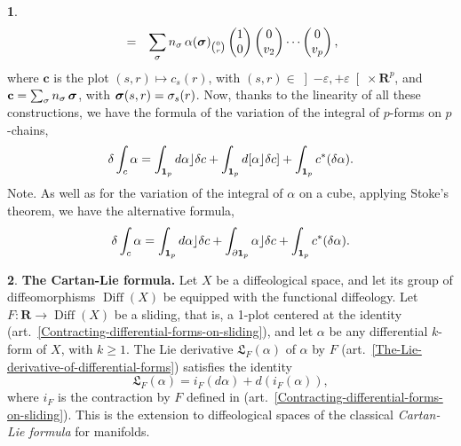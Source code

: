 \documentclass[11pt,reqno]{amsart}
\theoremstyle{definition}
\newtheorem{article}{}
\newcommand{\artlabel}[1]{{\bf #1.}}
\newcommand{\RR}{{\mathbf R}}
\newcommand{\cc}{{\mathbf c}}
\newcommand{\bsigma}{\mbox{\boldmath $\sigma$}}
\newcommand{\bmc}{\cc}
\def \F{{F}}
\def \X{{X}}
\newcommand{\fL}{{\mathfrak  L}}
\newcommand{\art}[1]{{(art.~\ref{#1})}}
\newcommand{\Diff}{\operatorname{Diff}}
\newcommand{\openinterval}[1]{\left] #1 \right[}
\newcommand{\DLie}{{\fL}}
\newcommand{\id}{{\bf 1}}
\begin{document}
\begin{article}
\begin{eqnarray*}
      & = & \sum_\sigma n_\sigma \, \alpha(\bsigma)_{0 \choose
      r}\begin{pmatrix}1 \\ 0\end{pmatrix} \begin{pmatrix}0 \\ v_2\end{pmatrix} \cdots 
      \begin{pmatrix}0 \\ v_{p}\end{pmatrix},
    \end{eqnarray*}
    where $\bmc$ is the plot $(s,r) \mapsto
      c_s(r)$, with $(s,r) \in \openinterval{-\varepsilon,
        +\varepsilon} \times \RR^p$, and $\bmc = \sum_\sigma
          n_\sigma \, \bsigma$, with $\bsigma(s,r) = \sigma_s(r)$.
    Now, thanks to the linearity of all these constructions,
    we have the formula of the variation of the integral of 
    $p$-forms on $p$-chains,
    $$
      \delta \int_c \alpha
      = \int_{\id_p} d\alpha \rfloor \delta c +
      \int_{\id_p} d[\alpha \rfloor \delta c] + \int_{\id_p}
      c^*(\delta \alpha).
      $$
    {\sc Note.} As well as for the variation of the integral
    of $\alpha$ on a cube, applying Stoke's theorem, we have
    the alternative formula,
    $$
      \delta \int_c \alpha
      = \int_{\id_p} d\alpha \rfloor \delta c +
      \int_{\partial \id_p} \alpha \rfloor \delta c +
      \int_{\id_p} c^*(\delta \alpha).
      $$ 
  \end{article} %
  
  \begin{article}\artlabel{The Cartan-Lie formula} 
    \label{The-Cartan-Lie-formula}
    Let $\X$ be a diffeological space, and let its
    group of diffeomorphisms $\Diff(\X)$ be equipped with the
    functional diffeology.
    Let $\F: \RR \to \Diff(\X)$ be a sliding, that is, a
    1-plot centered at the identity 
    \art{Contracting-differential-forms-on-sliding},
    and let $\alpha$ be any differential $k$-form of $\X$, with
    $k\geq 1$. The Lie derivative  $\DLie_\F(\alpha)$ of $\alpha$ by $\F$
    \art{The-Lie-derivative-of-differential-forms} satisfies the identity
    \begin{equation}\tag{$\heartsuit$}
      \DLie_\F(\alpha) =
      i_\F(d\alpha) + d(i_\F(\alpha)),
      \end{equation}
    where $i_\F$
    is the contraction by $\F$ defined in
    \art{Contracting-differential-forms-on-sliding}. This is
    the extension to
    diffeological spaces of the classical {\em Cartan-Lie formula} for manifolds.
  \end{article} %
  
\end{document}

